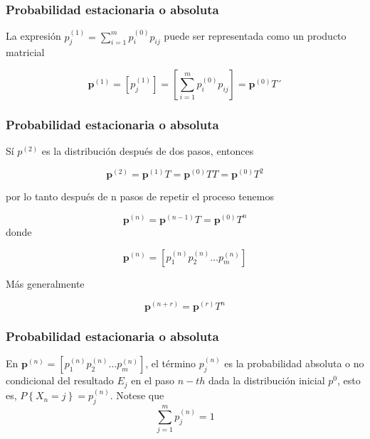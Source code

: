 \documentclass[spanish]{beamer}
\begin{document}
\begin{frame}
\frametitle{Probabilidad estacionaria o absoluta}

La expresión $p_{j}^{(1)}= \sum_{i=1}^{m}p_{i}^{(0)} p_{ij}$ puede ser representada como un producto matricial 


\begin{equation*}
\textbf{p}^{(1)}= \left[ p_{j}^{(1)} \right] = \left[ \sum_{i=1}^{m}p_{i}^{(0)} p_{ij} \right]  =\textbf{p}^{(0)}T´
\end{equation*}


\end{frame}
\begin{frame}
\frametitle{Probabilidad estacionaria o absoluta}

Sí $p^{(2)}$ es la distribución después de dos pasos, entonces 

\begin{equation*}
\textbf{p}^{(2)}= \textbf{p}^{(1)} T= \textbf{p}^{(0)}TT = \textbf{p}^{(0)}T^2 
\end{equation*}

por lo tanto después de n pasos de repetir el proceso tenemos 


\begin{equation*}
\textbf{p}^{(n)}= \textbf{p}^{(n-1)} T= \textbf{p}^{(0)}T^{n} 
\end{equation*}
donde

\begin{equation*}
\textbf{p}^{(n)}= \left[ p_{1}^{(n)} p_{2}^{(n)}  \ldots p_{m}^{(n)} \right]  
\end{equation*}

Más generalmente 

\begin{equation*}
\textbf{p}^{(n+r)}=\textbf{p}^{(r)}T^n 
\end{equation*}
\end{frame}
\begin{frame}
\frametitle{Probabilidad estacionaria o absoluta}

En $\textbf{p}^{(n)}= \left[ p_{1}^{(n)} p_{2}^{(n)}  \ldots p_{m}^{(n)} \right]  $, el término $p_{j}^{(n)}$ es la probabilidad absoluta o no condicional del resultado $E_{j}$ en el paso $n-th$ dada la distribución inicial $p^{0}$, esto es,
$P \left\lbrace  X_{n}= j \right\rbrace  = p_{j}^{(n)}$. Notese que \begin{equation*}
\sum_{j=1}^{m}{p_{j}^{(n)}}=1
\end{equation*} 
\end{frame}
\end{document}

